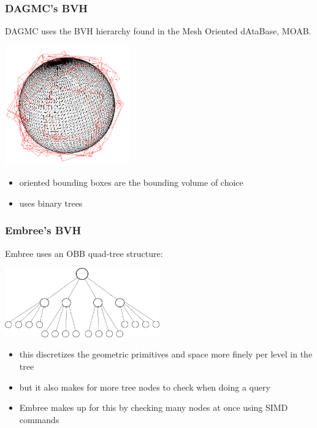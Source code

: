 \documentclass[12pt]{beamer}
\begin{document}
\begin{frame}
\frametitle{DAGMC's BVH}

DAGMC uses the BVH hierarchy found in the Mesh Oriented dAtaBase, MOAB.

\begin{center}
\includegraphics[width=0.4\textwidth]{./images/sphere_obbs_shallow.png}
\end{center}

\begin{itemize}
\item oriented bounding boxes are the bounding volume of choice
\item uses binary trees
\end{itemize}

\end{frame}



\begin{frame}

\frametitle{Embree's BVH}

Embree uses an OBB quad-tree structure:

\begin{center}
\includegraphics[width=0.5\textwidth]{./images/quad_tree.png}
\end{center}

\begin{itemize}
\item this discretizes the geometric primitives and space more finely per level in the tree
\item but it also makes for more tree nodes to check when doing a query
\item Embree makes up for this by checking many nodes at once using SIMD commands
\end{itemize}

\end{frame}
\end{document}
